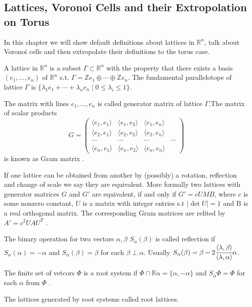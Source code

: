 \documentclass[a4paper, 12pt]{article}
\begin{document}
\subsection{Lattices, Voronoi Cells and their Extropolation on Torus}
\par In this chapter we will show default definitions about lattices in $\mathbb{R}^n$, talk about Voronoi cells and then extropolate their definitions to the torus case. 
\par A lattice in $\mathbb{R}^n$ is a subset $\Gamma\subset\mathbb{R}^n$ with the property that there exists a basis $(e_1, ..., e_n)$ of $\mathbb{R}^n$ s.t. $\Gamma = \mathbb{Z}e_1 \oplus\cdots\oplus \mathbb{Z}e_n$. The fundamental parallelotope of lattice $\Gamma$ is $\{\lambda_1e_1 + \cdots + \lambda_n e_n \mid 0\le\lambda_i\le1\}$.
\par The matrix with lines $e_1, ..., e_n$ is called generator matrix of lattice $\Gamma$.The matrix of scalar products
$$
G = 
\begin{pmatrix}
	\langle e_1, e_1\rangle & \langle e_1, e_2\rangle & \langle e_1, e_n\rangle \\
	\langle e_2, e_1\rangle & \langle e_2, e_2\rangle & \langle e_2, e_n\rangle \\
	\cdots & \cdots & \cdots & \cdots \\
	\langle e_n, e_1\rangle & \langle e_n, e_2\rangle & \langle e_n, e_n\rangle
\end{pmatrix}
$$
is known as Gram matrix \cite{ebeling}.
\par If one lattice can be obtained from another by (possibly) a rotation, reflection and change of scale we say they are equivalent. More formally two lattices with generator matrices $G$ and $G'$ are equivalent, if and only if $G' = cUMB$, where $c$ is some nonzero constant, $U$ is a matrix with integer entries s.t $|\det U| = 1$ and B is a real orthogonal matrix. The corresponding Gram matrices are relited by $A' = c^2UAU^{T}$ \cite{conway}.
\par The binary operation for two vectors $\alpha, \beta$ $S_\alpha(\beta)$ is called reflection if $S_\alpha(\alpha) = -\alpha$ and $S_\alpha(\beta) = \beta$ for each $\beta\perp\alpha$. 
Usually $S_\alpha(\beta) = \beta - 2\cfrac{\langle\lambda, \beta\rangle}{\langle\lambda, \alpha\rangle}\alpha$. 
\par The finite set of vetcors $\Phi$ is a root system if $\Phi\cap\mathbb{R}\alpha = \{\alpha, -\alpha\}$ and $S_\alpha\Phi = \Phi$ for each $\alpha$ from $\Phi$ \cite{smirnov}.
\par The lattices generated by root systems called root lattices.
\end{document}
